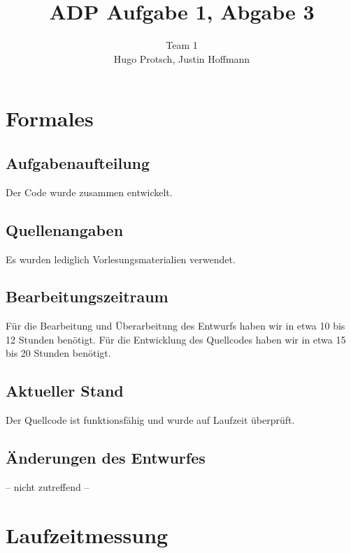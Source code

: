 \documentclass[11pt]{article}
\title{ADP Aufgabe 1, Abgabe 3}
\author{Team 1\\Hugo Protsch, Justin Hoffmann}
\begin{document}
    \maketitle


    \section{Formales}\label{sec:Formales}


    \subsection{Aufgabenaufteilung}
    Der Code wurde zusammen entwickelt.

    \subsection{Quellenangaben}

    Es wurden lediglich Vorlesungsmaterialien verwendet.


    \subsection{Bearbeitungszeitraum}
    Für die Bearbeitung und Überarbeitung des Entwurfs haben wir in etwa 10 bis
    12 Stunden benötigt.
    Für die Entwicklung des Quellcodes haben wir in etwa 15 bis 20 Stunden
    benötigt.

    \subsection{Aktueller Stand}
    Der Quellcode ist funktionsfähig und wurde auf Laufzeit überprüft.


    \subsection{Änderungen des Entwurfes}
    -- nicht zutreffend --


    \section{Laufzeitmessung}\label{sec:laufzeitmessung}
\end{document}
